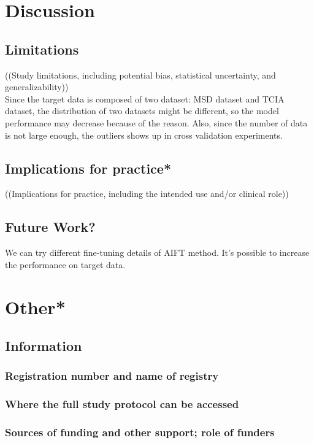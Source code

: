 \chapter{Discussion}
\section{Limitations} 
((Study limitations, including potential bias, statistical uncertainty, and generalizability)) \\
Since the target data is composed of two dataset: MSD dataset and TCIA dataset, the distribution of two datasets might be different, so the model performance may decrease because of the reason. Also, since the number of data is not large enough, the outliers shows up in cross validation experiments. 

\section{Implications for practice*}
((Implications for practice, including the intended use and/or clinical role)) \\

\section{Future Work?}
We can try different fine-tuning details of AIFT method. It's possible to increase the performance on target data. 

\chapter{Other*}
\section{Information}

\subsection{Registration number and name of registry}
\subsection{Where the full study protocol can be accessed}
\subsection{Sources of funding and other support; role of funders}


